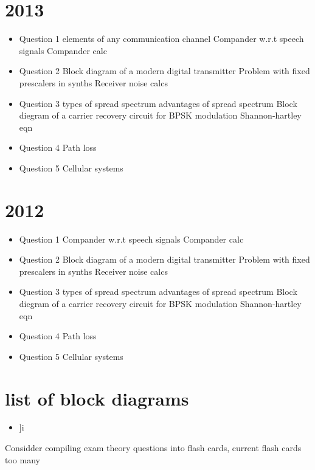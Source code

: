 \documentclass{article}
\begin{document}
\begin{multicols}{2}
\begin{itemize}
\end{itemize}
\section{2013}
\begin{itemize}
	\item Question 1
		 elements of any communication channel
		\subitem Compander w.r.t speech signals
		\subitem Compander calc
	\item Question 2
		\subitem Block diagram of a modern digital transmitter
		\subitem Problem with fixed prescalers in synths
		\subitem Receiver noise calcs
	\item Question 3
		 types of spread spectrum
		 advantages of spread spectrum
		\subitem Block diegram of a carrier recovery circuit for BPSK modulation
		\subitem Shannon-hartley eqn
	\item Question 4
		\subitem Path loss
	\item Question 5
		\subitem Cellular systems
	
\end{itemize}
\section{2012}
\begin{itemize}
	\item Question 1
		\subitem 
		\subitem Compander w.r.t speech signals
		\subitem Compander calc
	\item Question 2
		\subitem Block diagram of a modern digital transmitter
		\subitem Problem with fixed prescalers in synths
		\subitem Receiver noise calcs
	\item Question 3
		 types of spread spectrum
		 advantages of spread spectrum
		\subitem Block diegram of a carrier recovery circuit for BPSK modulation
		\subitem Shannon-hartley eqn
	\item Question 4
		\subitem Path loss
	\item Question 5
		\subitem Cellular systems
	
\end{itemize}
\section{list of block diagrams}
\begin{itemize}
	\item 
	]i
\end{itemize}
\end{multicols}
Considder compiling exam theory questions into flash cards, current flash cards too many
\end{document}
